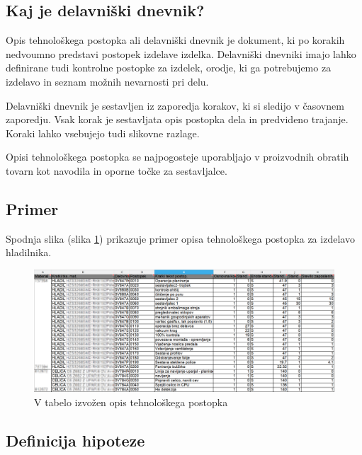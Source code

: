 \documentclass[a4paper, 12pt]{book}
\begin{document}
\subsection {Kaj je delavniški dnevnik?}

Opis tehnološkega postopka ali delavniški dnevnik je dokument, ki po korakih nedvoumno predstavi postopek izdelave izdelka.
Delavniški dnevniki imajo lahko definirane tudi kontrolne postopke za izdelek, orodje, ki ga potrebujemo za izdelavo in seznam možnih nevarnosti pri delu.

Delavniški dnevnik je sestavljen iz zaporedja korakov, ki si sledijo v časovnem zaporedju.
Vsak korak je sestavljata opis postopka dela in predvideno trajanje.
Koraki lahko vsebujejo tudi slikovne razlage.

Opisi tehnološkega postopka se najpogosteje uporabljajo v proizvodnih obratih tovarn kot navodila in oporne točke za sestavljalce.

\subsection{Primer}
Spodnja slika (slika \ref{sap_2}) prikazuje primer opisa tehnološkega postopka za izdelavo hladilnika.

\begin{figure}[H]
\begin{center}
\includegraphics[width=13.5cm]{sap_2}
\end{center}
\caption{V tabelo izvožen opis tehnološkega postopka}
\label{sap_2}
\end{figure}



\subsection{Definicija hipoteze}
\end{document}
